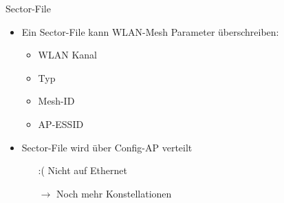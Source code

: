 \begin{frame}{Sector-File}
    \begin{itemize}
        \item Ein Sector-File kann WLAN-Mesh Parameter überschreiben:
        \begin{itemize}
            \item WLAN Kanal
            \item Typ
            \item Mesh-ID
            \item AP-ESSID
        \end{itemize}
        \item Sector-File wird über Config-AP verteilt
        \begin{itemize}
            \item[:(] Nicht auf Ethernet
            \item[$\rightarrow$] Noch mehr Konstellationen
        \end{itemize}
    \end{itemize}
    \vfill
    \raggedleft
\end{frame}
